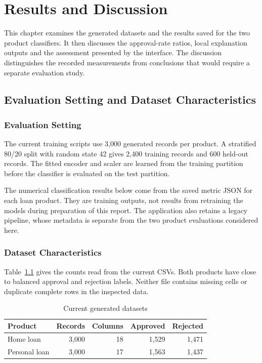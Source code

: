 \chapter[RESULTS AND DISCUSSION]{Results and Discussion}

This chapter examines the generated datasets and the results saved for the two product classifiers. It then discusses the approval-rate ratios, local explanation outputs and the assessment presented by the interface. The discussion distinguishes the recorded measurements from conclusions that would require a separate evaluation study.

\section{Evaluation Setting and Dataset Characteristics}
\subsection{Evaluation Setting}
The current training scripts use 3,000 generated records per product. A stratified 80/20 split with random state 42 gives 2,400 training records and 600 held-out records. The fitted encoder and scaler are learned from the training partition before the classifier is evaluated on the test partition.

The numerical classification results below come from the saved metric JSON for each loan product. They are training outputs, not results from retraining the models during preparation of this report. The application also retains a legacy pipeline, whose metadata is separate from the two product evaluations considered here.

\subsection{Dataset Characteristics}
Table~\ref{tab:dataset-summary} gives the counts read from the current CSVs. Both products have close to balanced approval and rejection labels. Neither file contains missing cells or duplicate complete rows in the inspected data.

\begin{table}[htbp]\centering\small
\caption{Current generated datasets}\label{tab:dataset-summary}
\begin{tabular}{lrrrr}\toprule
Product & Records & Columns & Approved & Rejected\\\midrule
Home loan & 3,000 & 18 & 1,529 & 1,471\\
Personal loan & 3,000 & 17 & 1,563 & 1,437\\\bottomrule
\end{tabular}\end{table}

